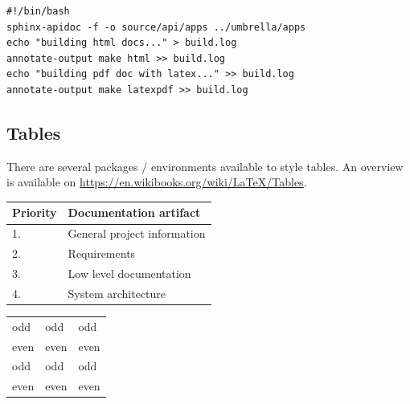\lstset{tabsize=2,language=bash}
\begin{lstlisting}[breaklines=true,frame=single,caption={Shellscript for building the software documentation in HTML and PDF},label=lst:builddocs]
#!/bin/bash
sphinx-apidoc -f -o source/api/apps ../umbrella/apps
echo "building html docs..." > build.log
annotate-output make html >> build.log
echo "building pdf doc with latex..." >> build.log
annotate-output make latexpdf >> build.log
\end{lstlisting}


\subsection{Tables}
\label{sec:tables}

There are several packages / environments available to style tables.
An overview is available on \url{https://en.wikibooks.org/wiki/LaTeX/Tables}.



\begin{table}[H]
\begin{center}
  \begin{tabular}{p{2cm}|p{8cm}}
	Priority &	Documentation artifact\\\hline
	1. &	General project information \\
	2. &	Requirements \\
	3. &	Low level documentation\\
	4. &	System architecture\\
  \end{tabular}
  \label{tab:importance_artifacts}
\end{center}
\end{table}


\begin{table}[H]
\begin{center}

  \begin{tabular}{lll}
    odd     & odd   & odd \\
    even    & even  & even\\
    odd     & odd   & odd \\
    even    & even  & even\\
  \end{tabular}
  \label{tab:colored}
\end{center}
\end{table}


